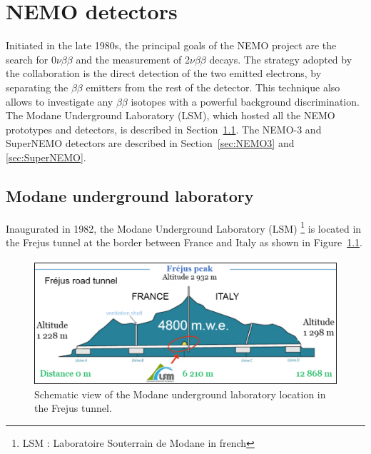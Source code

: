 \documentclass[main.tex]{subfiles}
\begin{document}
\chapter{NEMO detectors}\label{chap:NEMO}




\NI Initiated in the late 1980s, the principal goals of the NEMO project are the search for 0$\nu\beta\beta$ and the measurement of 2$\nu\beta\beta$ decays. The strategy adopted by the collaboration is the direct detection of the two emitted electrons, by separating the $\beta\beta$ emitters from the rest of the detector. This technique also allows to investigate any $\beta\beta$ isotopes with a powerful background discrimination. The Modane Underground Laboratory (LSM), which hosted all the NEMO prototypes and detectors, is described in Section~\ref{sec:LSM}. The NEMO-3 and SuperNEMO detectors are described in Section~\ref{sec:NEMO3} and \ref{sec:SuperNEMO}.


\section{Modane underground laboratory}\label{sec:LSM}


\NI Inaugurated in 1982, the Modane Underground Laboratory (LSM) \footnote{LSM : Laboratoire Souterrain de Modane in french} is located in the Frejus tunnel at the border between France and Italy as shown in Figure~\ref{LSMtunnel}.


\begin{figure}[h!]
\begin{center}
\includegraphics[scale=0.3]{pictures/Chap3/LSMtunnel.png}
\caption{Schematic view of the Modane underground laboratory location in the Frejus tunnel.}
\label{LSMtunnel}
\end{center}
\end{figure}
\end{document}
